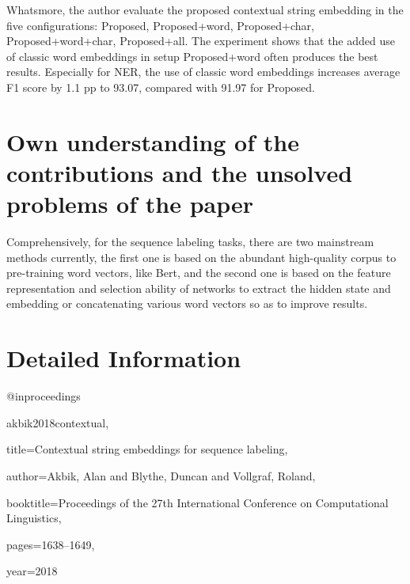 \documentclass[10pt,twocolumn,letterpaper]{article}
\begin{document}
Whatsmore, the author evaluate the proposed contextual string embedding in the five configurations: 
Proposed, Proposed+word, Proposed+char, Proposed+word+char, Proposed+all. The experiment shows that 
the added use of classic word embeddings in setup Proposed+word often produces the best results. 
Especially for NER, the use of classic word embeddings increases average F1 score by 1.1 pp to 93.07, 
compared with 91.97 for Proposed.

\section{Own understanding of the contributions and the unsolved problems of the paper}

Comprehensively, for the sequence labeling tasks, there are two mainstream methods currently, the 
first one is based on the abundant high-quality corpus to pre-training word vectors, like Bert, and 
the second one is based on the feature representation and selection ability of networks to extract the 
hidden state and embedding or concatenating various word vectors so as to improve results. 

\section{Detailed Information}
@inproceedings{akbik2018contextual,
	
	title={Contextual string embeddings for sequence labeling},
	
	author={Akbik, Alan and Blythe, Duncan and Vollgraf, Roland},
	
	booktitle={Proceedings of the 27th International Conference on Computational Linguistics},
	
	pages={1638--1649},
	
	year={2018}
}
\end{document}
